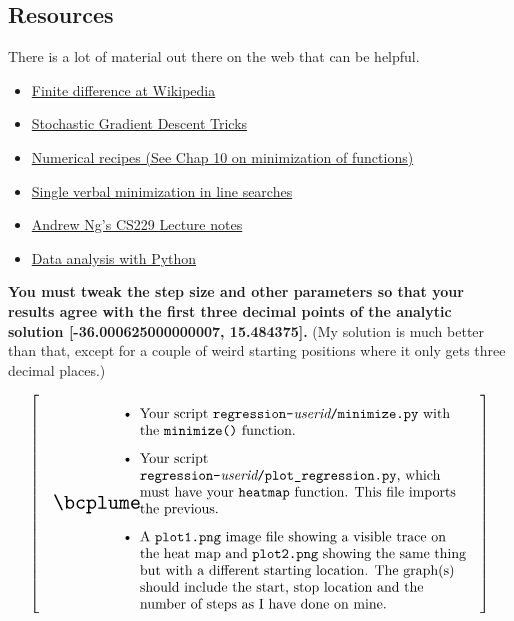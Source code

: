 \documentclass[titlepage]{tufte-book}
\makeatletter
\newenvironment{callout}[1]{
\[
  \left[
      \begin{tabular}{@{\quad}m{.05\textwidth}@{\qquad}m{.75\textwidth}@{\quad}}
        \scalebox{1.5}{#1} & 
          \raggedright%
}
{
      \end{tabular}
    \right]
\]
}
\makeatother
\begin{document}
\begin{fullwidth}
\section{Resources}

There is a lot of material out there on the web that can be helpful.

\begin{itemize}
\item \href{http://en.wikipedia.org/wiki/Finite_difference}{Finite difference at Wikipedia}
\item \href{http://research.microsoft.com/pubs/192769/tricks-2012.pdf}{Stochastic Gradient Descent Tricks}
\item \href{http://apps.nrbook.com/fortran/index.html}{Numerical recipes (See Chap 10 on minimization of functions)}
\item \href{http://adl.stanford.edu/aa222/Lecture_Notes_files/AA222-Lecture2.pdf}{Single verbal minimization in line searches}
\item \href{http://cs229.stanford.edu/notes/cs229-notes1.pdf}{Andrew Ng's CS229 Lecture notes}
\item \href{http://people.duke.edu/~ccc14/pcfb/analysis.html}{Data analysis with Python}
\end{itemize}

{\bf You must tweak the step size and other parameters so that your results agree with the first {\bf three} decimal points of the analytic solution [-36.000625000000007, 15.484375].} (My solution is much better than that, except for a couple of weird starting positions where it only gets three decimal places.)

\begin{callout}{\bcplume}
\begin{itemize}
\item Your script {\tt regression-}{\em userid}{\tt /minimize.py} with the {\tt minimize()} function.
\item Your script {\tt regression-}{\em userid}{\tt /plot\_regression.py}, which must have your {\tt heatmap} function.  This file imports the previous.
\item A {\tt plot1.png} image file showing a visible trace on the heat map and {\tt plot2.png} showing the same thing but with a different starting location. The graph(s) should include the start, stop location and the number of steps as I have done on mine.\end{itemize}
\end{callout}

\end{fullwidth}
\end{document}
